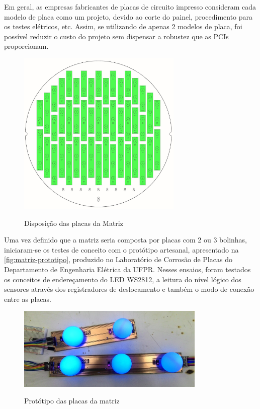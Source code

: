 Em geral, as empresas fabricantes de placas de circuito impresso consideram cada modelo de placa como um projeto, devido ao corte do painel, procedimento para os testes elétricos, etc. Assim, se utilizando de apenas 2 modelos de placa, foi possível reduzir o custo do projeto sem dispensar a robustez que as PCIs proporcionam.

\begin{figure}[H]
    \centering
    \caption{Disposição das placas da Matriz}
    \includegraphics[width=0.7\textwidth]{./dados/figuras/placas-matriz-colunas}
    \label{fig:placas-matriz-colunas}
\end{figure}

Uma vez definido que a matriz seria composta por placas com 2 ou 3 bolinhas, iniciaram-se os testes de conceito com o protótipo artesanal, apresentado na \autoref{fig:matriz-prototipo}, produzido no Laboratório de Corrosão de Placas do Departamento de Engenharia Elétrica da UFPR. Nesses ensaios, foram testados os conceitos de endereçamento do LED WS2812, a leitura do nível lógico dos sensores através dos registradores de deslocamento e também o modo de conexão entre as placas.

\begin{figure}[H]
    \centering
    \caption{Protótipo das placas da matriz}
    \includegraphics[width=0.8\textwidth]{./dados/figuras/mesa-protoboard}
    \label{fig:matriz-prototipo}
\end{figure}

